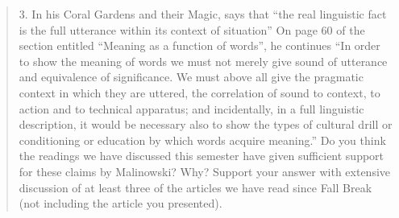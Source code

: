\documentclass[man,12pt,natbib]{apa6}
\begin{document}
\begin{quote}
	3. In his Coral Gardens and their Magic, %
	\citet{Malinowski35} says that ``the real linguistic fact is the full
	utterance within its context of situation'' On page 60 of the section
	entitled ``Meaning as a function of words'', he continues ``In order to
	show the meaning of words we must not merely give sound of utterance and
	equivalence of significance. We must above all give the pragmatic context
	in which they are uttered, the correlation of sound to context, to action
	and to technical apparatus; and incidentally, in a full linguistic
	description, it would be necessary also to show the types of cultural drill
	or conditioning or education by which words acquire meaning.'' Do you think
	the readings we have discussed this semester have given sufficient support
	for these claims by Malinowski?  Why?  Support your answer with extensive
	discussion of at least three of the articles we have read since Fall Break
	(not including the article you presented).  
\end{quote}

\clearpage

\end{document}
